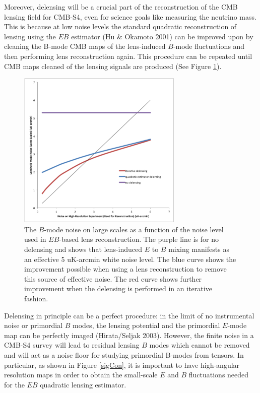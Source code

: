 Moreover, delensing will be a crucial part of the reconstruction of the CMB lensing field for CMB-S4, even for science goals like measuring the neutrino mass.  This is because at low noise levels the standard quadratic reconstruction of lensing using the $EB$ estimator (Hu \& Okamoto 2001) can be improved upon by cleaning the B-mode CMB maps of the lens-induced $B$-mode fluctuations and then performing lens reconstruction again.  This procedure can be repeated until CMB maps cleaned of the lensing signals are produced (See Figure \ref{iterative}).  

\begin{figure}[htbp]
\centering
\includegraphics[width=0.70\textwidth]{CMBLensing/delensingIterative.png}
\vspace{0.3cm}
\caption{The $B$-mode noise on large scales as a function of the noise level used in $EB$-based lens reconstruction.  The purple line is for no delensing and shows that lens-induced  $E$ to $B$ mixing manifests as an effective 5 uK-arcmin white noise level.  The blue curve shows the improvement possible when using a lens reconstruction to remove this source of effective noise.  The red curve shows further improvement when the delensing is performed in an iterative fashion.}
\label{iterative}
\end{figure}

Delensing in principle can be a perfect procedure: in the limit of no instrumental noise or primordial $B$ modes, the lensing potential and the primordial $E$-mode map can be perfectly imaged (Hirata/Seljak 2003).  However, the finite noise in a CMB-S4 survey will lead to residual lensing $B$ modes which cannot be removed and will act as a noise floor for studying primordial B-modes from tensors.  
In particular, as shown in Figure \ref{sigCon}, it is important to have high-angular resolution maps in order to obtain the small-scale $E$ and $B$ fluctuations needed for the $EB$ quadratic lensing estimator.


